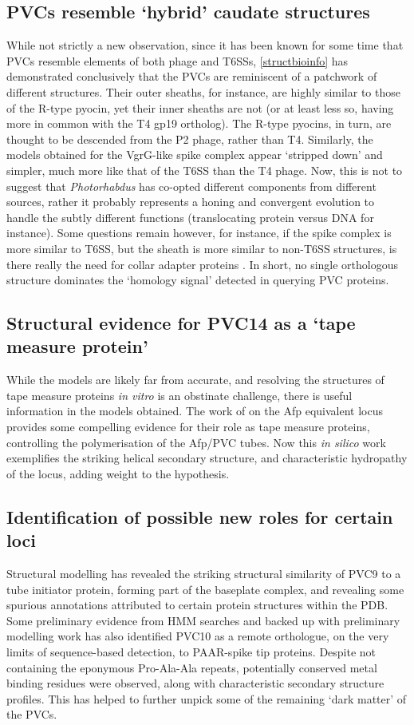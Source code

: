 \subsection{PVCs resemble `hybrid' caudate structures}
While not strictly a new observation, since it has been known for some time that PVCs resemble elements of both phage and T6SSs, \vref{structbioinfo} has demonstrated conclusively that the PVCs are reminiscent of a patchwork of different structures. Their outer sheaths, for instance, are highly similar to those of the R-type pyocin, yet their inner sheaths are not (or at least less so, having more in common with the T4 gp19 ortholog). The R-type pyocins, in turn, are thought to be descended from the P2 phage, rather than T4. Similarly, the models obtained for the VgrG-like spike complex appear `stripped down' and simpler, much more like that of the T6SS than the T4 phage. Now, this is not to suggest that \emph{Photorhabdus} has co-opted different components from different sources, rather it probably represents a honing and convergent evolution to handle the subtly different functions (translocating protein versus DNA for instance). Some questions remain however, for instance, if the spike complex is more similar to T6SS, but the sheath is more similar to non-T6SS structures, is there really the need for collar adapter proteins \citep{Renault2018}. In short, no single orthologous structure dominates the `homology signal' detected in querying PVC proteins.

\subsection{Structural evidence for PVC14 as a `tape measure protein'}
While the models are likely far from accurate, and resolving the structures of tape measure proteins \emph{in vitro} is an obstinate challenge, there is useful information in the models obtained. The work of \cite{Rybakova2015} on the Afp equivalent locus provides some compelling evidence for their role as tape measure proteins, controlling the polymerisation of the Afp/PVC tubes. Now this \emph{in silico} work exemplifies the striking helical secondary structure, and characteristic hydropathy of the locus, adding weight to the hypothesis.

\subsection{Identification of possible new roles for certain loci}
Structural modelling has revealed the striking structural similarity of PVC9 to a tube initiator protein, forming part of the baseplate complex, and revealing some spurious annotations attributed to certain protein structures within the PDB. Some preliminary evidence from HMM searches and backed up with preliminary modelling work has also identified PVC10 as a remote orthologue, on the very limits of sequence-based detection, to PAAR-spike tip proteins. Despite not containing the eponymous Pro-Ala-Ala repeats, potentially conserved metal binding residues were observed, along with characteristic secondary structure profiles. This has helped to further unpick some of the remaining `dark matter' of the PVCs.

